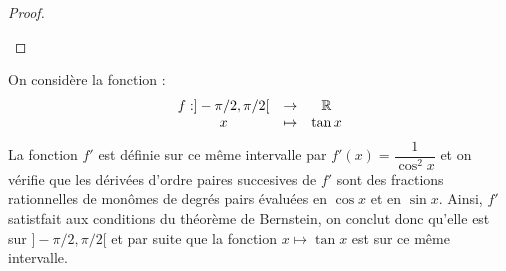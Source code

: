 \begin{proof}
\begin{enumerate}[label=(\roman*)]
\end{enumerate}
\end{proof}

\begin{appl}
On considère la fonction :
\[ \begin{array}{c c c} 
f: ] -\pi/2, \pi/2[ & \to & \mathbb{R} \\
x & \mapsto & \tan{x} 
\end{array} \]
La fonction $f'$ est définie sur ce même intervalle par $f'(x) = \dfrac1{\cos^2{x}}$ et on vérifie que les dérivées d'ordre paires succesives
de $f'$ sont des fractions rationnelles de monômes de degrés pairs évaluées en $\cos{x}$ et en $\sin{x}$.
Ainsi, $f'$ satistfait aux conditions du théorème de Bernstein, on conclut donc qu'elle est \dse sur $]-\pi/2, \pi/2[$
et par suite que la fonction $x \mapsto \tan{x}$ est \dse sur ce même intervalle.
\end{appl}

